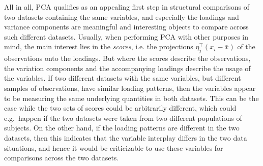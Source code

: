 \documentclass[titlepage,11pt,twoside]{article}
\begin{document}
All in all, PCA qualifies as an appealing first step in structural comparisons of two datasets containing the same variables, and especially the loadings and variance components are meaningful and interesting objects to compare across such different datasets. Usually, when performing PCA with other purposes in mind, the main interest lies in the \textit{scores}, i.e. the projections $\eta_j^\top (x_i - \bar{x})$ of the observations onto the loadings. But where the scores describe the observations, the variation components and the accompanying loadings describe the usage of the variables. If two different datasets with the same variables, but different samples of observations, have similar loading patterns, then the variables appear to be measuring the same underlying quantities in both datasets. This can be the case while the two sets of scores could be arbitrarily different, which could e.g.\ happen if the two datasets were taken from two different populations of subjects. On the other hand, if the loading patterns are different in the two datasets, then this indicates that the variable interplay differs in the two data situations, and hence it would be criticizable to use these variables for comparisons across the two datasets.
\end{document}
